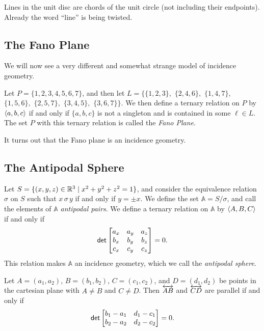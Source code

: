 Lines in the unit disc are chords of the unit circle (not including their endpoints). Already the word ``line'' is being twisted.



\subsection{The Fano Plane}

We will now see a very different and somewhat strange model of incidence geometry.

\begin{dfn}
Let \(P = \{1,2,3,4,5,6,7\}\), and then let \(L = \{\{1,2,3\},\) \(\{2,4,6\},\) \(\{1,4,7\},\) \(\{1,5,6\},\) \(\{2,5,7\},\) \(\{3,4,5\},\) \(\{3,6,7\}\}\). We then define a ternary relation on $P$ by $\langle a, b, c \rangle$ if and only if $\{a,b,c\}$ is not a singleton and is contained in some $\ell \in L$. The set $P$ with this ternary relation is called the \emph{Fano Plane}.
\end{dfn}

It turns out that the Fano plane is an incidence geometry.



\subsection{The Antipodal Sphere}

\begin{dfn}
Let $S = \{ (x,y,z) \in \mathbb{R}^3 \mid x^2 + y^2 + z^2 = 1 \}$, and consider the equivalence relation $\sigma$ on $S$ such that $x \,\sigma\, y$ if and only if $y = \pm x$. We define the set $\mathbb{A} = S/\sigma$, and call the elements of $\mathbb{A}$ \emph{antipodal pairs}. We define a ternary relation on $\mathbb{A}$ by $\langle A, B, C \rangle$ if and only if \[ \mathsf{det} \begin{bmatrix} a_x & a_y & a_z \\ b_x & b_y & b_z \\ c_x & c_y & c_z \end{bmatrix} = 0. \] This relation makes $\mathbb{A}$ an incidence geometry, which we call the \emph{antipodal sphere}.
\end{dfn}



\Exercises%

\begin{exercise}
Let $A = (a_1,a_2)$, $B = (b_1,b_2)$, $C = (c_1,c_2)$, and $D = (d_1,d_2)$ be points in the cartesian plane with $A \neq B$ and $C \neq D$. Then $\overleftrightarrow{AB}$ and $\overleftrightarrow{CD}$ are parallel if and only if \[ \mathsf{det} \begin{bmatrix} b_1 - a_1 & d_1 - c_1 \\ b_2 - a_2 & d_2 - c_2 \end{bmatrix} = 0. \]
\end{exercise}

